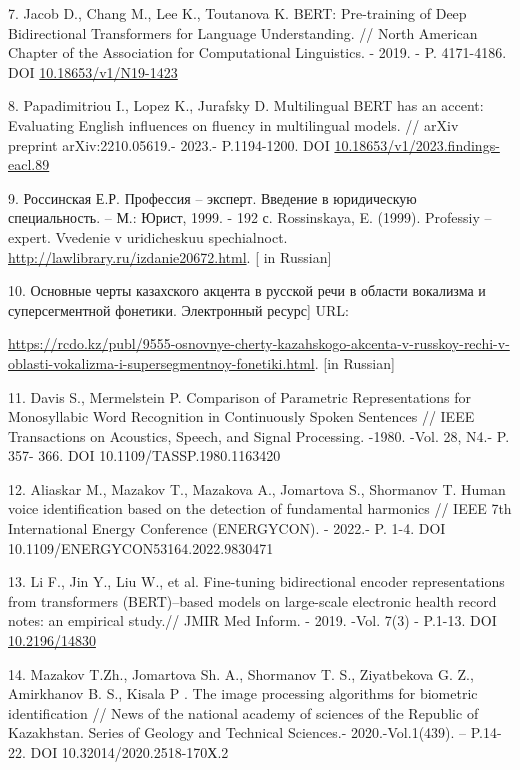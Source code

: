 7. Jacob D., Chang M., Lee K., Toutanova K. BERT: Pre-training of Deep
Bidirectional Transformers for Language Understanding. // North American
Chapter of the Association for Computational Linguistics. - 2019. - P.
4171-4186. DOI
\href{https://doi.org/10.18653/v1/N19-1423}{10.18653/v1/N19-1423}

8. Papadimitriou I., Lopez K., Jurafsky D. Multilingual BERT has an
accent: Evaluating English influences on fluency in multilingual models.
// arXiv preprint arXiv:2210.05619.- 2023.- P.1194-1200. DOI
\href{https://doi.org/10.18653/v1/2023.findings-eacl.89}{10.18653/v1/2023.findings-eacl.89}

9. Россинская Е.Р. Профессия -- эксперт. Введение в юридическую
специальность. -- М.: Юрист, 1999. - 192 с. Rossinskaya, E. (1999).
Professiy -- expert. Vvedenie v uridicheskuu spechialnoct.
\url{http://lawlibrary.ru/izdanie20672.html}. {[} in Russian{]}

10. Основные черты казахского акцента в русской речи в области вокализма
и суперсегментной фонетики. Электронный ресурс{]} URL:

\url{https://rcdo.kz/publ/9555-osnovnye-cherty-kazahskogo-akcenta-v-russkoy-rechi-v-oblasti-vokalizma-i-supersegmentnoy-fonetiki.html}.
{[}in Russian{]}

11. Davis S., Mermelstein P. Comparison of Parametric Representations
for Monosyllabic Word Recognition in Continuously Spoken Sentences //
IEEE Transactions on Acoustics, Speech, and Signal Processing. -1980.
-Vol. 28, N4.- P. 357- 366. DOI 10.1109/TASSP.1980.1163420

12. Aliaskar M., Mazakov T., Mazakova A., Jomartova S., Shormanov T.
Human voice identification based on the detection of fundamental
harmonics // IEEE 7th International Energy Conference (ENERGYCON). -
2022.- P. 1-4. DOI 10.1109/ENERGYCON53164.2022.9830471

13. Li F., Jin Y., Liu W., et al. Fine-tuning bidirectional encoder
representations from transformers (BERT)--based models on large-scale
electronic health record notes: an empirical study.// JMIR Med Inform. -
2019. -Vol. 7(3) - P.1-13. DOI
\href{https://doi.org/10.2196/14830}{10.2196/14830}

14. Mazakov T.Zh., Jomartova Sh. A., Shormanov T. S., Ziyatbekova G. Z.,
Amirkhanov B. S., Kisala P . The image processing algorithms for
biometric identification // News of the national academy of sciences of
the Republic of Kazakhstan. Series of Geology and Technical Sciences.-
2020.-Vol.1(439). -- P.14-22. DOI 10.32014/2020.2518-170Х.2

